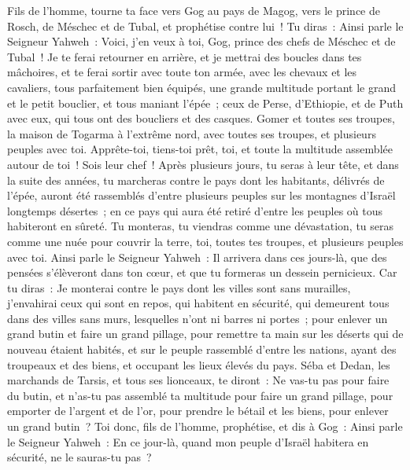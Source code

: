 \begin{multicols}{2}
Fils de l'homme, tourne ta face vers Gog au pays de Magog, vers le prince de Rosch, de Méschec et de Tubal, et prophétise contre lui~!
Tu diras~: Ainsi parle le Seigneur Yahweh~: Voici, j'en veux à toi, Gog, prince des chefs de Méschec et de Tubal~!
Je te ferai retourner en arrière, et je mettrai des boucles dans tes mâchoires, et te ferai sortir avec toute ton armée, avec les chevaux et les cavaliers, tous parfaitement bien équipés, une grande multitude portant le grand et le petit bouclier, et tous maniant l'épée~;
ceux de Perse, d'Ethiopie, et de Puth avec eux, qui tous ont des boucliers et des casques.
Gomer et toutes ses troupes, la maison de Togarma à l'extrême nord, avec toutes ses troupes, et plusieurs peuples avec toi.
Apprête-toi, tiens-toi prêt, toi, et toute la multitude assemblée autour de toi~! Sois leur chef~!
Après plusieurs jours, tu seras à leur tête, et dans la suite des années, tu marcheras contre le pays dont les habitants, délivrés de l'épée, auront été rassemblés d'entre plusieurs peuples sur les montagnes d'Israël longtemps désertes~; en ce pays qui aura été retiré d'entre les peuples où tous habiteront en sûreté.
Tu monteras, tu viendras comme une dévastation, tu seras comme une nuée pour couvrir la terre, toi, toutes tes troupes, et plusieurs peuples avec toi.
Ainsi parle le Seigneur Yahweh~: Il arrivera dans ces jours-là, que des pensées s'élèveront dans ton cœur, et que tu formeras un dessein pernicieux.
Car tu diras~: Je monterai contre le pays dont les villes sont sans murailles, j'envahirai ceux qui sont en repos, qui habitent en sécurité, qui demeurent tous dans des villes sans murs, lesquelles n'ont ni barres ni portes~;
pour enlever un grand butin et faire un grand pillage, pour remettre ta main sur les déserts qui de nouveau étaient habités, et sur le peuple rassemblé d'entre les nations, ayant des troupeaux et des biens, et occupant les lieux élevés du pays.
Séba et Dedan, les marchands de Tarsis, et tous ses lionceaux, te diront~: Ne vas-tu pas pour faire du butin, et n'as-tu pas assemblé ta multitude pour faire un grand pillage, pour emporter de l'argent et de l'or, pour prendre le bétail et les biens, pour enlever un grand butin~?
Toi donc, fils de l'homme, prophétise, et dis à Gog~: Ainsi parle le Seigneur Yahweh~: En ce jour-là, quand mon peuple d'Israël habitera en sécurité, ne le sauras-tu pas~?

\end{multicols}
